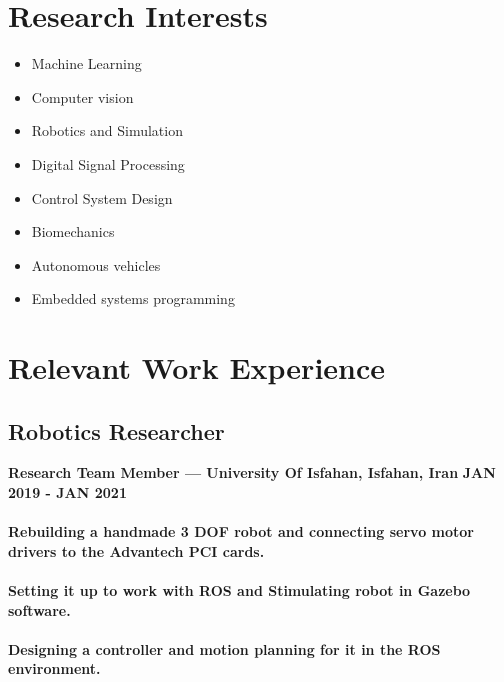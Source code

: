 \documentclass[a4paper]{article}
\begin{document}
    \section{Research Interests}


        \begin{multicols}{2}[]
            \begin{itemize}
                \itemsep0em 
                \item Machine Learning
                \item Computer vision
                \item Robotics and Simulation
                \item Digital Signal Processing
                \item Control System Design
                \item Biomechanics
                \item Autonomous vehicles
                \item Embedded systems programming
            \end{itemize}
        \end{multicols}

    \section{Relevant Work Experience}
        \subsection{Robotics Researcher}
        {\bfseries\small Research Team Member — University Of Isfahan, Isfahan, Iran}
        \hfill
        {\bfseries\small JAN 2019 - JAN 2021}

        \paragraph{Rebuilding a handmade 3 DOF robot and connecting servo motor drivers to the Advantech PCI cards.}
        \paragraph{Setting it up to work with ROS and Stimulating robot in Gazebo software.}
        \paragraph{Designing a controller and motion planning for it in the ROS environment.}
\end{document}
